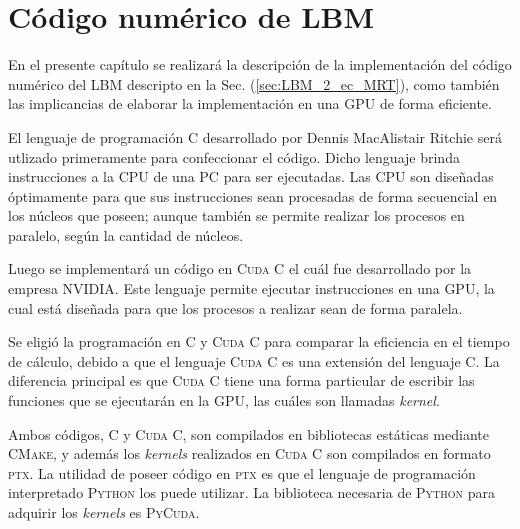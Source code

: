 \chapter{Código numérico de LBM}
\graphicspath{{figs/cap3/}}
\label{cap3}




En el presente capítulo se realizará la descripción de la implementación del código numérico del LBM descripto en la Sec. (\ref{sec:LBM_2_ec_MRT}), como también las implicancias de elaborar la implementación en una GPU de forma eficiente.

El lenguaje de programación \textsc{C} desarrollado por Dennis MacAlistair Ritchie será utlizado primeramente para confeccionar el código. Dicho lenguaje brinda instrucciones a la CPU de una PC para ser ejecutadas. Las CPU son diseñadas óptimamente para que sus instrucciones sean procesadas de forma secuencial en los núcleos que poseen; aunque también se permite realizar los procesos en paralelo, según la cantidad de núcleos.

Luego se implementará un código en \textsc{Cuda C} el cuál fue desarrollado por la\\
empresa NVIDIA. Este lenguaje permite ejecutar instrucciones en una GPU, la cual está diseñada para que los procesos a realizar sean de forma paralela.

Se eligió la programación en \textsc{C} y \textsc{Cuda C} para comparar la eficiencia en el tiempo de cálculo, debido a que el lenguaje \textsc{Cuda C} es una extensión del lenguaje \textsc{C}. La diferencia principal es que \textsc{Cuda C}  tiene una forma particular de escribir las funciones que se ejecutarán en la GPU, las cuáles son llamadas \textit{kernel}.

Ambos códigos, \textsc{C} y \textsc{Cuda C}, son compilados en bibliotecas estáticas mediante \textsc{CMake}, y además los \textit{kernels} realizados en \textsc{Cuda C} son compilados en formato \textsc{ptx}. La utilidad de poseer código en \textsc{ptx} es que el lenguaje de programación interpretado \textsc{Python} los puede utilizar. La biblioteca necesaria de \textsc{Python} para adquirir los \textit{kernels} es \textsc{PyCuda}.

